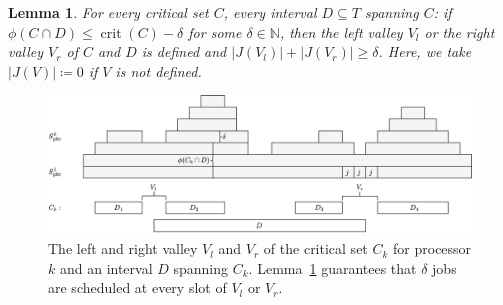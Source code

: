 \documentclass[a4paper]{article}
\DeclareMathOperator{\crit}{crit}
\newtheorem{lemma}[theorem]{Lemma}
\begin{document}
\begin{lemma}\label{lemma:valley}
  For every critical set $C$, every interval $D \subseteq T$ spanning $C$:
  if $\phi(C \cap D) \leq \crit(C) - \delta$ for some $\delta \in \mathbb{N}$, then the left valley $V_l$ or the right valley $V_r$ of $C$ and $D$ is defined and $|J(V_l)| + |J(V_r)| \geq \delta$.
  Here, we take $|J(V)| \coloneqq 0$ if $V$ is not defined.
\end{lemma}
\begin{figure}[H]
  \centering
  \includegraphics[width=1\textwidth]{graphics/left_right_valleys.jpg}
  \caption{The left and right valley $V_l$ and $V_r$ of the critical set $C_k$ for processor $k$ and an interval $D$ spanning $C_k$.
  Lemma~\ref{lemma:valley} guarantees that $\delta$ jobs are scheduled at every slot of $V_l$ or $V_r$.}\label{fig:left_right_valleys}
\end{figure}
\end{document}
